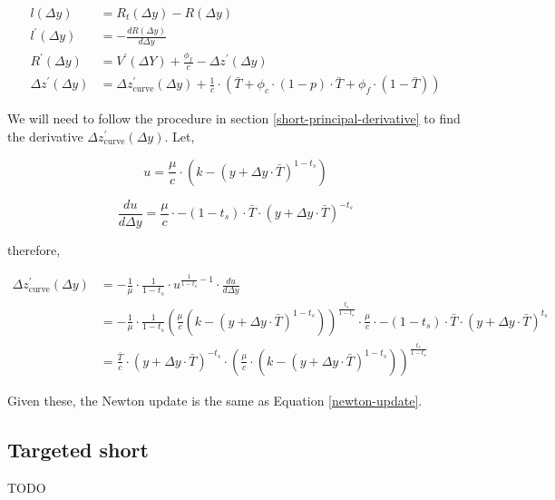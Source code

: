 \begin{equation}
\begin{aligned}
    l(\Delta y) &= R_{t}(\Delta y) - R(\Delta y) \\
    l^{\prime}(\Delta y) &= - \frac{d R(\Delta y)}{d \Delta y} \\
    R^{\prime}(\Delta y) &= V^{\prime}(\Delta Y) + \frac{\phi_f}{c} - \Delta z^{\prime}(\Delta y) \\
    \Delta z^{\prime}(\Delta y) &= \Delta z^{\prime}_{\text{curve}}(\Delta y)
    + \frac{1}{c} \cdot
    \left( \bar{T} + \phi_c \cdot (1-p) \cdot \bar{T} + \phi_f \cdot \left(1 - \bar{T}\right) \right)
\end{aligned}
\end{equation}

We will need to follow the procedure in section \ref{short-principal-derivative} to find the derivative $\Delta z^{\prime}_{\text{curve}}(\Delta y)$.
Let,

\begin{equation}
u = \frac{\mu}{c} \cdot \left( k - (y + \Delta y \cdot \bar{T})^{1-t_s} \right)
\end{equation}

\begin{equation}
\frac{du}{d \Delta y} = \frac{\mu}{c} \cdot -(1 - t_s) \cdot \bar{T} \cdot (y + \Delta y \cdot \bar{T})^{-t_s}
\end{equation}

therefore,

\begin{equation}
\begin{aligned}
\Delta z^{\prime}_{\text{curve}}(\Delta y) &= - \tfrac{1}{\mu} \cdot \tfrac{1}{1-t_s} \cdot u^{\tfrac{1}{1-t_s} - 1} \cdot \tfrac{du}{d \Delta y} \\
&= - \tfrac{1}{\mu} \cdot \tfrac{1}{1-t_s} \left( \tfrac{\mu}{c} \left( k - (y + \Delta y \cdot \bar{T})^{1 - t_s} \right) \right)^{\tfrac{t_s}{1-t_s}}
\cdot \tfrac{\mu}{c} \cdot -(1 - t_s) \cdot \bar{T} \cdot (y + \Delta y \cdot \bar{T})^{t_s} \\
&= \tfrac{\bar{T}}{c} \cdot (y + \Delta y \cdot \bar{T})^{-t_s} \cdot \left( \tfrac{\mu}{c} \cdot \left( k - (y + \Delta y \cdot \bar{T})^{1 - t_s} \right) \right)^{\tfrac{t_s}{1 - t_s}}
\end{aligned}
\end{equation}

Given these, the Newton update is the same as Equation \eqref{newton-update}.

\subsection{Targeted short}\label{targeted-short}
TODO